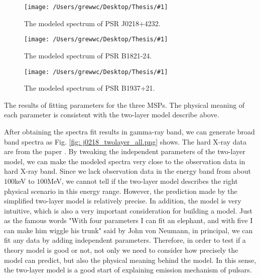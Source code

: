 \documentclass[12pt]{report}
\newcommand{\mycaption}[1]{\protect \caption{#1}}
\newcommand{\singleFig}[3]{
 \begin{figure}[!ht]
  \centering
  \texttt{[image: /Users/grewwc/Desktop/Thesis/\#1]}
  \mycaption{#3}
 \label{fig: #1}
 \end{figure}
}
\newcommand{\change}[1]{
  $<$\colorbox{red}{\textbf{change}}$>$#1$<$\colorbox{red}{\textbf{/change}}$>$
}
\newcommand{\mayChange}[1]{
  $<$\colorbox{red}{\textbf{mayChange}}$>$#1$<$\colorbox{red}{\textbf{/mayChange}}$>$
}
\begin{document}
          \singleFig{j0218_twolayer_cur.png}{0.41}{The modeled spectrum of PSR J0218+4232.}
          \singleFig{b1821_twolayer_cur.png}{0.4}{The modeled spectrum of PSR B1821-24.}
          \singleFig{j1939_twolayer_cur.png}{0.41}{The modeled spectrum of PSR B1937+21.}
          
          \begin{table}[!ht]
            \centering
            \mycaption{The results of fitting parameters for the three MSPs. The physical 
              meaning of each parameter is consistent with the two-layer model describe above.}
            \label{table: twolayer_fit_parameter}
          \end{table}
          \vspace{0.5cm}
          
          After obtaining the spectra fit results in gamma-ray band, we can generate broad band spectra 
          as Fig. \ref{fig: j0218_twolayer_all.png} shows. 
          The hard X-ray data are from the paper \cite{0004-637X-845-2-159}. By tweaking the 
          independent parameters of the two-layer model, we can make the modeled spectra very 
          close to the observation data in hard X-ray band. Since we lack observation data in 
          the energy band from about $100$keV to $100$MeV, we cannot tell if the two-layer model 
          describes the right physical scenario in this energy range. However, the prediction made 
          by the simplified two-layer model is relatively precise. In addition, the model is very 
          intuitive, which is also a very important consideration for building a model. Just as 
          the famous words "With four parameters I can fit an elephant, and with five I 
          can make him wiggle his trunk" 
          said by John von Neumann, in principal, we can fit any data by adding independent parameters. 
          Therefore, in order to test if a theory model is good or not, not only we need to consider 
          how precisely the model can predict, but also the physical meaning behind the model. In this 
          sense, the two-layer model is a good start of explaining emission mechanism of 
          pulsars. 
          
\end{document}
